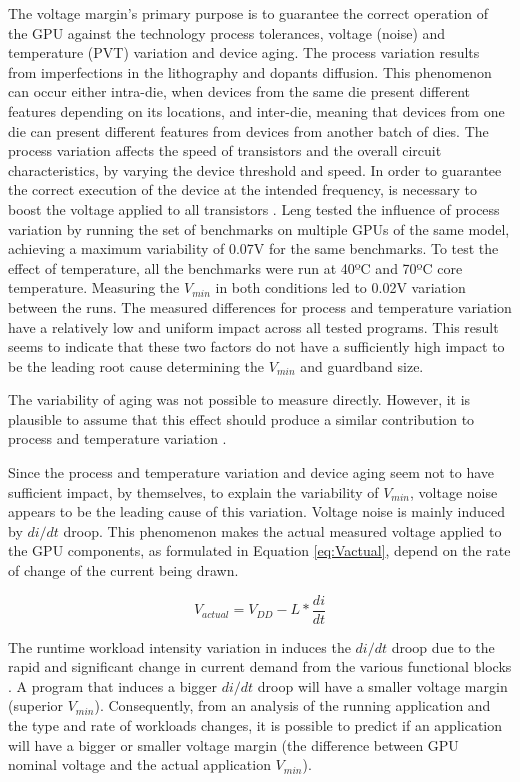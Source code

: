 The voltage margin's primary purpose is to guarantee the correct operation of the GPU against the technology process tolerances, voltage (noise) and temperature (PVT) variation and device aging.
The process variation results from imperfections in the lithography and dopants diffusion. This phenomenon can occur either intra-die, when devices from the same die present different features depending on its locations, and inter-die, meaning that devices from one die can present different features from devices from another batch of dies. The process variation affects the speed of transistors and the overall circuit characteristics, by varying the device threshold and speed. In order to guarantee the correct execution of the device at the intended frequency, is necessary to boost the voltage applied to all transistors \cite{thomas_core_2016}.
Leng tested the influence of process variation by running the set of benchmarks on multiple GPUs of the same model, achieving a maximum variability of 0.07V for the same benchmarks. To test the effect of temperature, all the benchmarks were run at 40ºC and 70ºC core temperature. Measuring the $V_{min}$ in both conditions led to 0.02V variation between the runs. The measured differences for process and temperature variation have a relatively low and uniform impact across all tested programs. This result seems to indicate that these two factors do not have a sufficiently high impact to be the leading root cause determining the $V_{min}$ and guardband size.

The variability of aging was not possible to measure directly. However, it is plausible to assume that this effect should produce a similar contribution to process and temperature variation \cite{leng_safe_2015}.

Since the process and temperature variation and device aging seem not to have sufficient impact, by themselves, to explain the variability of $V_{min}$, voltage noise appears to be the leading cause of this variation. Voltage noise is mainly induced by $di/dt$ droop. This phenomenon makes the actual measured voltage applied to the GPU components, as formulated in Equation \ref{eq:Vactual}, depend on the rate of change of the current being drawn. 

\begin{equation}
    \label{eq:Vactual}
    V_{actual} = V_{DD}-L*\frac{di}{dt}
\end{equation}

The runtime workload intensity variation in induces the $di/dt$ droop due to the rapid and significant change in current demand from the various functional blocks \cite{thomas_core_2016}. A program that induces a bigger $di/dt$ droop will have a smaller voltage margin (superior $V_{min}$). Consequently, from an analysis of the running application and the type and rate of workloads changes, it is possible to predict if an application will have a bigger or smaller voltage margin (the difference between GPU nominal voltage and the actual application $V_{min}$).

